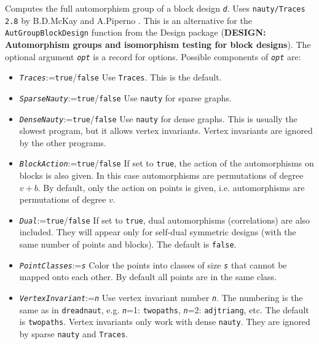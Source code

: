 \documentclass[a4paper,11pt]{report}
\begin{document}
{{{ Computes the full automorphism group of a block design \mbox{\texttt{\mdseries\slshape d}}. Uses \texttt{nauty/Traces 2.8} by B.D.McKay and A.Piperno \cite{MP14}. This is an alternative for the \texttt{AutGroupBlockDesign} function from the \textsf{Design} package  (\textbf{DESIGN: Automorphism groups and isomorphism testing for block designs}). The optional argument \mbox{\texttt{\mdseries\slshape opt}} is a record for options. Possible components of \mbox{\texttt{\mdseries\slshape opt}} are: 
\begin{itemize}
\item \mbox{\texttt{\mdseries\slshape Traces}}:=\texttt{true}/\texttt{false} Use \texttt{Traces}. This is the default.
\item \mbox{\texttt{\mdseries\slshape SparseNauty}}:=\texttt{true}/\texttt{false} Use \texttt{nauty} for sparse graphs.
\item \mbox{\texttt{\mdseries\slshape DenseNauty}}:=\texttt{true}/\texttt{false} Use \texttt{nauty} for dense graphs. This is usually the slowest program, but it allows vertex
invariants. Vertex invariants are ignored by the other programs.
\item \mbox{\texttt{\mdseries\slshape BlockAction}}:=\texttt{true}/\texttt{false} If set to \texttt{true}, the action of the automorphisms on blocks is also given. In this case
automorphisms are permutations of degree $v+b$. By default, only the action on points is given, i.e. automorphisms are
permutations of degree $v$.
\item \mbox{\texttt{\mdseries\slshape Dual}}:=\texttt{true}/\texttt{false} If set to \texttt{true}, dual automorphisms (correlations) are also included. They will appear only
for self-dual symmetric designs (with the same number of points and blocks).
The default is \texttt{false}.
\item \mbox{\texttt{\mdseries\slshape PointClasses}}:=\mbox{\texttt{\mdseries\slshape s}} Color the points into classes of size \mbox{\texttt{\mdseries\slshape s}} that cannot be mapped onto each other. By default all points are in the same
class.
\item \mbox{\texttt{\mdseries\slshape VertexInvariant}}:=\mbox{\texttt{\mdseries\slshape n}} Use vertex invariant number \mbox{\texttt{\mdseries\slshape n}}. The numbering is the same as in \texttt{dreadnaut}, e.g. \mbox{\texttt{\mdseries\slshape n}}=1: \texttt{twopaths}, \mbox{\texttt{\mdseries\slshape n}}=2: \texttt{adjtriang}, etc. The default is \texttt{twopaths}. Vertex invariants only work with dense \texttt{nauty}. They are ignored by sparse \texttt{nauty} and \texttt{Traces}.

\end{itemize}}}}
\end{document}
